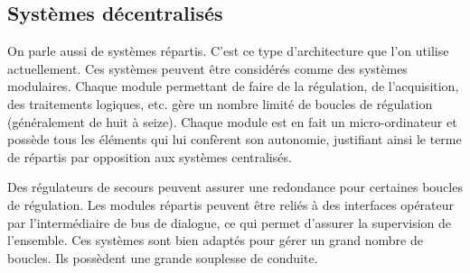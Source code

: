 \subsection{	Systèmes décentralisés }

On parle aussi de systèmes répartis. C’est ce type d’architecture que l’on utilise actuellement. Ces systèmes peuvent être considérés comme des systèmes modulaires. Chaque module permettant de faire de la régulation, de l’acquisition, des traitements logiques, etc. gère un nombre limité de boucles de régulation (généralement de huit à seize). Chaque module est en fait un micro-ordinateur et possède tous les éléments qui lui confèrent son autonomie, justifiant ainsi le terme de répartis par opposition aux systèmes centralisés. 
\vspace{0.3cm}

Des régulateurs de secours peuvent assurer une redondance pour certaines boucles de régulation. 
Les modules répartis peuvent être reliés à des interfaces opérateur par l’intermédiaire de bus de dialogue, ce qui permet d’assurer la supervision de l’ensemble. 
Ces systèmes sont bien adaptés pour gérer un grand nombre de boucles. Ils possèdent une grande souplesse de conduite.


